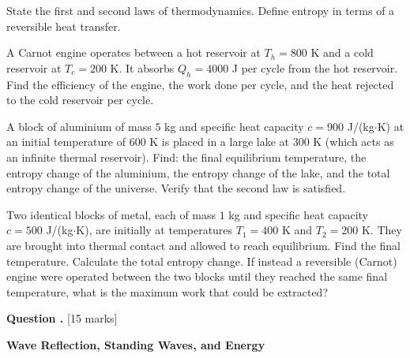 \documentclass[12pt,a4paper]{article}
\newcounter{questioncounter}
\newcommand{\question}[1]{%
  \stepcounter{questioncounter}%
  \vspace{0.5cm}%
  \noindent\textbf{Question \thequestioncounter.} \hfill [#1 marks]%
  \vspace{0.2cm}%
  \par%
}
\begin{document}
\begin{parts}
\item State the first and second laws of thermodynamics. Define entropy in terms of a reversible heat transfer. 

\item A Carnot engine operates between a hot reservoir at $T_h = 800$ K and a cold reservoir at $T_c = 200$ K. It absorbs $Q_h = 4000$ J per cycle from the hot reservoir. Find the efficiency of the engine, the work done per cycle, and the heat rejected to the cold reservoir per cycle. 

\item A block of aluminium of mass $5$ kg and specific heat capacity $c = 900$ J/(kg$\cdot$K) at an initial temperature of $600$ K is placed in a large lake at $300$ K (which acts as an infinite thermal reservoir). Find: the final equilibrium temperature, the entropy change of the aluminium, the entropy change of the lake, and the total entropy change of the universe. Verify that the second law is satisfied. 

\item Two identical blocks of metal, each of mass $1$ kg and specific heat capacity $c = 500$ J/(kg$\cdot$K), are initially at temperatures $T_1 = 400$ K and $T_2 = 200$ K. They are brought into thermal contact and allowed to reach equilibrium. Find the final temperature. Calculate the total entropy change. If instead a reversible (Carnot) engine were operated between the two blocks until they reached the same final temperature, what is the maximum work that could be extracted? 
\end{parts}

\newpage

\question{15}

\noindent\textbf{Wave Reflection, Standing Waves, and Energy}
\end{document}
